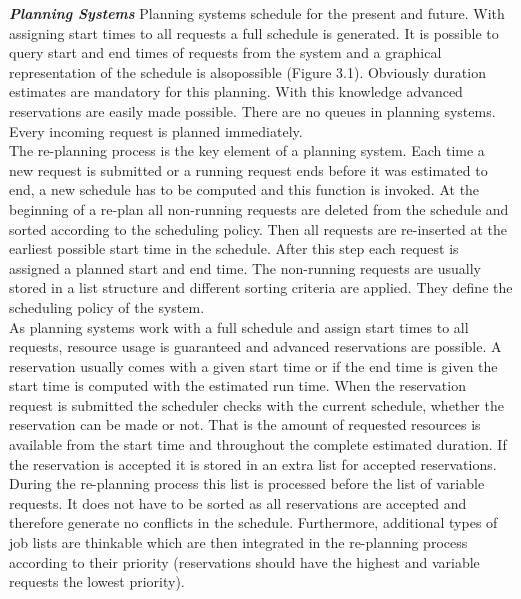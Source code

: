 \textbf{\textit{Planning Systems }}Planning systems schedule for the present and future. With assigning start times to all requests a full schedule is generated. It is possible to query start and end times of requests from the system and a graphical representation of the schedule is alsopossible (Figure 3.1). Obviously duration estimates are mandatory for this planning. With this knowledge advanced reservations are easily made possible. There are no queues in planning systems. Every incoming request is planned immediately.\\

The re-planning process is the key element of a planning system. Each time a new request is submitted or a running request ends before it was estimated to end, a new schedule has to be computed and this function is invoked. At the beginning of a re-plan all non-running requests are deleted from the schedule and sorted according to the scheduling policy. Then all requests are re-inserted at the earliest possible start time in the schedule. After this step each request is assigned a planned start and end time. The non-running requests are usually stored in a list structure and different sorting criteria are applied. They define the scheduling policy of the system.\\

As planning systems work with a full schedule and assign start times to all requests, resource usage is guaranteed and advanced reservations are possible. A reservation usually comes with a given start time or if the end time is given the start time is computed with the estimated run time. When the reservation request is submitted the scheduler checks with the current schedule, whether the reservation can be made or not. That is the amount of requested resources is available from the start time and throughout the complete estimated duration. If the reservation is accepted it is stored in an extra list for accepted reservations. During the re-planning process this list is processed before the list of variable requests. It does not have to be sorted as all reservations are accepted and therefore generate no conflicts in the schedule. Furthermore, additional types of job lists are thinkable which are then integrated in the re-planning process according to their priority (reservations should have the highest and variable requests the lowest priority).\\

